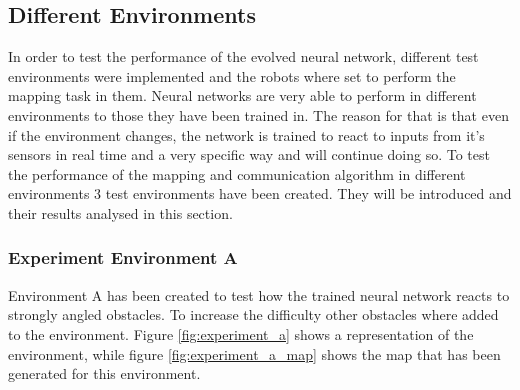\subsection{Different Environments}
In order to test the performance of the evolved neural network, different test environments were implemented and the robots where set to perform the mapping task in them. 
Neural networks are very able to perform in different environments to those they have been trained in. The reason for that is that even if the environment changes, the network is trained to react to inputs from it's sensors in real time and a very specific way and will continue doing so. 
To test the performance of the mapping and communication algorithm in different environments 3 test environments have been created. They will be introduced and their results analysed in this section.\\

\subsubsection{Experiment Environment A}
Environment A has been created to test how the trained neural network reacts to strongly angled obstacles. To increase the difficulty other obstacles where added to the environment.
Figure \ref{fig:experiment_a} shows a representation of the environment, while figure \ref{fig:experiment_a_map} shows the map that has been generated for this environment.  

